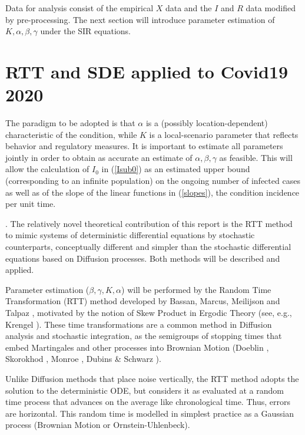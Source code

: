 \documentclass{article}
\begin{document}
\bigskip

Data for analysis consist of the empirical $X$ data and the $I$ and $R$ data modified by pre-processing. The next section will introduce parameter estimation of $K,\alpha, \beta,\gamma$ under the SIR equations.

\section{RTT and SDE applied to Covid19 2020} \label{RTTsection}

The paradigm to be adopted is that $\alpha$ is a (possibly location-dependent) characteristic of the condition, while $K$ is a local-scenario parameter that reflects behavior and regulatory measures. It is important to estimate all parameters jointly in order to obtain as accurate an estimate of $\alpha, \beta, \gamma$ as feasible. This will allow the calculation of $I_0$ in (\ref{Isub0}) as an estimated upper bound (corresponding to an infinite population) on the ongoing number of infected cases as well as of the slope of the linear functions in (\ref{slopes}), the condition incidence per unit time.

\bigskip

. The relatively novel theoretical contribution of this report is the RTT method to mimic systems of deterministic differential equations by stochastic counterparts, conceptually different and simpler than the stochastic differential equations based on Diffusion processes. Both methods will be described and applied.

Parameter estimation ($\beta, \gamma, K, \alpha$) will be performed by the Random Time Transformation (RTT) method developed by Bassan, Marcus, Meilijson and Talpaz \cite{Bassanetal}, motivated by the notion of Skew Product in Ergodic Theory (see, e.g., Krengel \cite{Krengel}). These time transformations are a common method in Diffusion analysis and stochastic integration, as the semigroups of stopping times that embed Martingales and other processes into Brownian Motion (Doeblin \cite{Doeblin}, Skorokhod \cite{Skorokhod}, Monroe \cite{Monroe}, Dubins \& Schwarz \cite{DubSch}).

Unlike Diffusion methods that place noise vertically, the RTT method adopts the solution to the deterministic ODE, but considers it as evaluated at a random time process that advances on the average like chronological time. Thus, errors are horizontal. This random time is modelled in simplest practice as a Gaussian process (Brownian Motion or Ornstein-Uhlenbeck).
\end{document}
